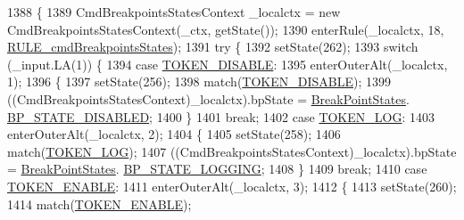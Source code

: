 \begin{DoxyCode}
1388                                                                                               \{
1389     CmdBreakpointsStatesContext \_localctx = \textcolor{keyword}{new} CmdBreakpointsStatesContext(\_ctx, getState());
1390     enterRule(\_localctx, 18, \hyperlink{classgov_1_1nasa_1_1jpf_1_1inspector_1_1client_1_1parser_1_1_console_grammar_parser_a8609514a3f626ea2e7dd47fc626e3533}{RULE\_cmdBreakpointsStates});
1391     \textcolor{keywordflow}{try} \{
1392       setState(262);
1393       \textcolor{keywordflow}{switch} (\_input.LA(1)) \{
1394       \textcolor{keywordflow}{case} \hyperlink{classgov_1_1nasa_1_1jpf_1_1inspector_1_1client_1_1parser_1_1_console_grammar_parser_a90e268d3330c4dd5955ee838092f75ff}{TOKEN\_DISABLE}:
1395         enterOuterAlt(\_localctx, 1);
1396         \{
1397         setState(256);
1398         match(\hyperlink{classgov_1_1nasa_1_1jpf_1_1inspector_1_1client_1_1parser_1_1_console_grammar_parser_a90e268d3330c4dd5955ee838092f75ff}{TOKEN\_DISABLE});
1399          ((CmdBreakpointsStatesContext)\_localctx).bpState =  \hyperlink{enumgov_1_1nasa_1_1jpf_1_1inspector_1_1interfaces_1_1_break_point_states}{BreakPointStates}.
      \hyperlink{enumgov_1_1nasa_1_1jpf_1_1inspector_1_1interfaces_1_1_break_point_states_a3ae6a736b3f7eeb695b11fccaab73fa2}{BP\_STATE\_DISABLED}; 
1400         \}
1401         \textcolor{keywordflow}{break};
1402       \textcolor{keywordflow}{case} \hyperlink{classgov_1_1nasa_1_1jpf_1_1inspector_1_1client_1_1parser_1_1_console_grammar_parser_aa106f2b3ce29b81c583bdcd51ec566a4}{TOKEN\_LOG}:
1403         enterOuterAlt(\_localctx, 2);
1404         \{
1405         setState(258);
1406         match(\hyperlink{classgov_1_1nasa_1_1jpf_1_1inspector_1_1client_1_1parser_1_1_console_grammar_parser_aa106f2b3ce29b81c583bdcd51ec566a4}{TOKEN\_LOG});
1407          ((CmdBreakpointsStatesContext)\_localctx).bpState =  \hyperlink{enumgov_1_1nasa_1_1jpf_1_1inspector_1_1interfaces_1_1_break_point_states}{BreakPointStates}.
      \hyperlink{enumgov_1_1nasa_1_1jpf_1_1inspector_1_1interfaces_1_1_break_point_states_ae881aa2d81965de8cca2c1d2fac0b504}{BP\_STATE\_LOGGING}; 
1408         \}
1409         \textcolor{keywordflow}{break};
1410       \textcolor{keywordflow}{case} \hyperlink{classgov_1_1nasa_1_1jpf_1_1inspector_1_1client_1_1parser_1_1_console_grammar_parser_a470e2b55da42238181711a5c607b3fd5}{TOKEN\_ENABLE}:
1411         enterOuterAlt(\_localctx, 3);
1412         \{
1413         setState(260);
1414         match(\hyperlink{classgov_1_1nasa_1_1jpf_1_1inspector_1_1client_1_1parser_1_1_console_grammar_parser_a470e2b55da42238181711a5c607b3fd5}{TOKEN\_ENABLE});

\end{DoxyCode}
